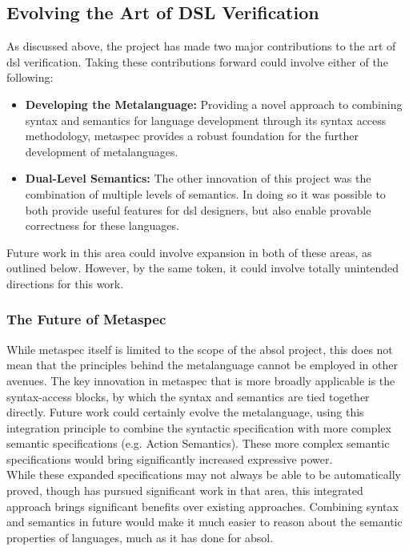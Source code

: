 \subsection{Evolving the Art of DSL Verification} %
\label{sub:evolving_the_art_of_dsl_verification}
As discussed above, the project has made two major contributions to the art of \gls{dsl} verification.
Taking these contributions forward could involve either of the following:
\begin{itemize}
    \item \textbf{Developing the Metalanguage:} Providing a novel approach to combining syntax and semantics for language development through its syntax access methodology, \gls{metaspec} provides a robust foundation for the further development of metalanguages.
    \item \textbf{Dual-Level Semantics:} The other innovation of this project was the combination of multiple levels of semantics.
    In doing so it was possible to both provide useful features for \gls{dsl} designers, but also enable provable correctness for these languages.
\end{itemize}

Future work in this area could involve expansion in both of these areas, as outlined below.
However, by the same token, it could involve totally unintended directions for this work.

\subsubsection{The Future of Metaspec} %
\label{ssub:the_future_of_metaspec}
While \gls{metaspec} itself is limited to the scope of the \gls{absol} project, this does not mean that the principles behind the metalanguage cannot be employed in other avenues. 
The key innovation in metaspec that is more broadly applicable is the syntax-access blocks, by which the syntax and semantics are tied together directly. 
Future work could certainly evolve the metalanguage, using this integration principle to combine the syntactic specification with more complex semantic specifications (e.g. Action Semantics).
These more complex semantic specifications would bring significantly increased expressive power.\\

While these expanded specifications may not always be able to be automatically proved, though \citet{Mosses:2009:CS:1596486.1596489} has pursued significant work in that area, this integrated approach brings significant benefits over existing approaches.
Combining syntax and semantics in future would make it much easier to reason about the semantic properties of languages, much as it has done for \gls{absol}.

